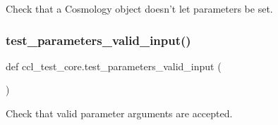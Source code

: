 \begin{DoxyVerb}Check that a Cosmology object doesn't let parameters be set.
\end{DoxyVerb}
 \mbox{\label{namespaceccl__test__core_a5d78733a80588dd665203627d89b0b6f}} 
\subsubsection{\texorpdfstring{test\+\_\+parameters\+\_\+valid\+\_\+input()}{test\_parameters\_valid\_input()}}
{\footnotesize\ttfamily def ccl\+\_\+test\+\_\+core.\+test\+\_\+parameters\+\_\+valid\+\_\+input (\begin{DoxyParamCaption}{ }\end{DoxyParamCaption})}

\begin{DoxyVerb}Check that valid parameter arguments are accepted.
\end{DoxyVerb}
 